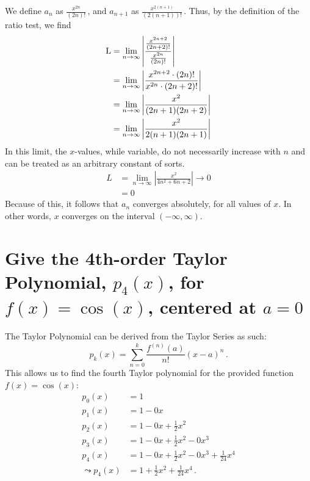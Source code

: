 \documentclass[12pt, letterpaper]{article}
\begin{document}
We define $a_n$ as $\frac{x^{2n}}{{(2n)}!}$\,, and $a_{n+1}$ as
$\frac{x^{2{(n+1)}}}{{(2{(n+1)})}!}$\,.
Thus, by the definition of the ratio test, we find
\begin{subequations}
\begin{align}
	\textup{L} &=
	\lim_{n\to\infty}
	\left|
	\frac
	{\frac{x^{2n+2}}{{(2n+2)}!}}
	{\frac{x^{2n}}{{(2n)}!}}
	\right|\\
	  &= \lim_{n\to\infty}
	\left|
	\frac
	{x^{2n+2}\cdot{(2n)}!}
	{x^{2n}\cdot{(2n+2)}!}
	\right|\\
	  &=
	   \lim_{n\to\infty}
	   \left|
	   \frac
	   {x^{2}}
	   {{(2n+1)}{(2n+2)}}
	   \right|\\
	  &=
	  \lim_{n\to\infty}
	  \left|
	  \frac{x^2}{2{(n+1)}{(2n+1)}}
	  \right|
\end{align}
\end{subequations}
In this limit, the $x$-values, while variable,
do not necessarily increase with $n$ and can be treated as an arbitrary
constant of sorts.
\begin{subequations}
\begin{align}
	L &= 
	\lim_{n\to\infty}
	\left|
	\frac{x^2}{4n^2+6n+2}
	\right|\to0\\
	  &= 0
\end{align}
\end{subequations}
Because of this, it follows that $a_n$ converges absolutely,
for all values of $x$.
In other words, $x$ converges on the interval ${(-\infty,\infty)}$.

\hfill\blacksquare%
\clearpage


\section{Give the 4th-order Taylor Polynomial, $p_{4}{(x)}$, for 
$f{(x)}=\cos{(x)}$, centered at $a=0$}

The Taylor Polynomial can be derived from the Taylor Series as such:
\begin{equation}
	p_{k}{(x)} = \sum_{n=0}^{k} \frac{f^{(n)}{(a)}}{n!}{(x-a)}^{n} \,.
\end{equation}
This allows us to find the fourth Taylor polynomial for the provided function
$f{(x)}=\cos{(x)}$:
\begin{subequations}
	\begin{align}
		p_{0}{(x)} &= 1\\
		p_{1}{(x)} &= 1 - 0x\\
		p_{2}{(x)} &= 1 - 0x + \frac{1}{2}x^{2}\\
		p_{3}{(x)} &= 1 - 0x + \frac{1}{2}x^{2} - 0x^{3}\\
		p_{4}{(x)} &= 1 - 0x + \frac{1}{2}x^{2} - 0x^{3} + \frac{1}{24}x^{4}\\
		\leadsto p_{4}{(x)} &= 1 + \frac{1}{2}x^{2} + \frac{1}{24}x^{4}\,.
	\end{align}
\end{subequations}
\hfill\blacksquare%
\end{document}

